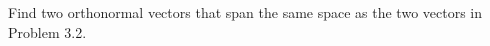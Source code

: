 \item [3.3] Find two orthonormal vectors that span the same space as the two vectors in Problem 3.2.
